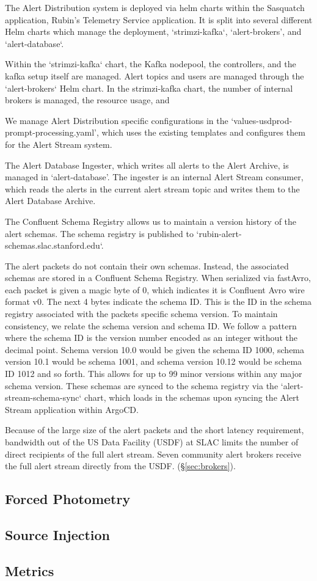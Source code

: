 The Alert Distribution system is deployed via helm charts within the Sasquatch application, Rubin's Telemetry Service application.
It is split into several different Helm charts which manage the deployment, `strimzi-kafka`, `alert-brokers', and `alert-database`.

Within the `strimzi-kafka` chart, the Kafka nodepool, the controllers, and the kafka setup itself are managed. Alert topics and
users are managed through the `alert-brokers` Helm chart. In the strimzi-kafka chart, the number of internal brokers is managed, the
resource usage, and

We manage Alert Distribution specific configurations in the `values-usdprod-prompt-processing.yaml', which uses the existing templates
and configures them for the Alert Stream system.

The Alert Database Ingester, which writes all alerts to the Alert Archive, is managed in `alert-database'. The ingester
is an internal Alert Stream consumer, which reads the alerts in the current alert stream topic and writes them
to the Alert Database Archive.

 The Confluent Schema Registry allows us to maintain a version history of the alert schemas. The schema registry is published to
 `rubin-alert-schemas.slac.stanford.edu`.

The alert packets do not contain their own schemas. Instead, the associated schemas are stored in a Confluent Schema Registry.
 When serialized via fastAvro, each packet is given a magic byte of 0, which indicates it is Confluent Avro wire format v0.
 The next 4 bytes indicate the schema ID. This is the ID in the schema registry associated with the packets specific schema version.
 To maintain consistency, we relate the schema version and schema ID. We follow a pattern where the schema ID is the version number encoded as an integer without the decimal point.
 Schema version 10.0 would be given the schema ID 1000, schema version 10.1 would be schema 1001, and schema version 10.12 would be schema ID 1012 and so forth.
 This allows for up to 99 minor versions within any major schema version. These schemas are synced to the schema registry via the
 `alert-stream-schema-sync` chart, which loads in the schemas upon syncing the Alert Stream application within ArgoCD.

Because of the large size of the alert packets and the short latency requirement, bandwidth out of the US Data Facility (USDF) at SLAC limits the number of direct recipients of the full alert stream.
Seven community alert brokers receive the full alert stream directly from the USDF. (\S \ref{sec:brokers}).

\subsection{Forced Photometry}

\subsection{Source Injection}

\subsection{Metrics}